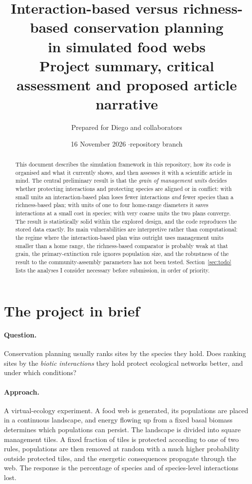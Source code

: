 \documentclass[11pt,a4paper]{article}
\title{\textbf{Interaction-based versus richness-based conservation planning\\ in simulated food webs}\\[4pt]
\large Project summary, critical assessment and proposed article narrative}
\author{Prepared for Diego and collaborators}
\date{16 November 2026 \quad$\cdot$\quad repository branch \code{cleanup/repo-organisation}}
\begin{document}
\maketitle

\begin{abstract}
\noindent This document describes the simulation framework in this repository, how its code is organised
and what it currently shows, and then assesses it with a scientific article in mind. The central
preliminary result is that the \emph{grain of management units} decides whether protecting interactions and
protecting species are aligned or in conflict: with small units an interaction-based plan loses fewer
interactions \emph{and} fewer species than a richness-based plan; with units of one to four home-range
diameters it saves interactions at a small cost in species; with very coarse units the two plans converge.
The result is statistically solid within the explored design, and the code reproduces the stored data
exactly. Its main vulnerabilities are interpretive rather than computational: the regime where the
interaction-based plan wins outright uses management units smaller than a home range, the richness-based
comparator is probably weak at that grain, the primary-extinction rule ignores population size, and the
robustness of the result to the community-assembly parameters has not been tested. Section~\ref{sec:todo}
lists the analyses I consider necessary before submission, in order of priority.
\end{abstract}

\tableofcontents
\newpage

\section{The project in brief}

\paragraph{Question.} Conservation planning usually ranks sites by the species they hold. Does ranking
sites by the \emph{biotic interactions} they hold protect ecological networks better, and under which
conditions?

\paragraph{Approach.} A virtual-ecology experiment. A food web is generated, its populations are placed in a
continuous landscape, and energy flowing up from a fixed basal biomass determines which populations can
persist. The landscape is divided into square management tiles. A fixed fraction of tiles is protected
according to one of two rules, populations are then removed at random with a much higher probability
outside protected tiles, and the energetic consequences propagate through the web. The response is the
percentage of species and of species-level interactions lost.
\end{document}
